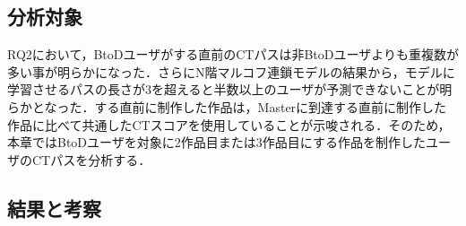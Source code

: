 \documentclass[submit]{ipsj}
\newcommand{\todo}[1]{\colorbox{yellow}{{\bf TODO}:}{\color{red} {\textbf{[#1]}}}}
\begin{document}
\subsection{分析対象}
RQ2において，BtoDユーザが\textcolor{red}{}する直前のCTパスは非BtoDユーザよりも重複数が多い事が明らかになった．さらにN階マルコフ連鎖モデルの結果から，モデルに学習させるパスの長さが3を超えると半数以上のユーザが予測できないことが明らかとなった．\textcolor{red}{}\textcolor{red}{}する直前に制作した作品は，Masterに到達する直前に制作した作品に比べて共通したCTスコアを使用していることが示唆される．そのため，本章ではBtoDユーザを対象に2作品目または3作品目に\textcolor{red}{}する作品を制作したユーザのCTパスを分析する．



\subsection{結果と考察}

\begin{table}[t]
  \caption{2番目または3番目にDevelopingの作品を制作したBtoDユーザ数，およびDevelopingを制作するまで（\textcolor{red}{}時の作品を含む）のCTパスの種類数}
  \label{tab:ct-users}
  \vspace{2mm}
  \centering
   \vspace{-2mm}
\end{table}
\end{document}
